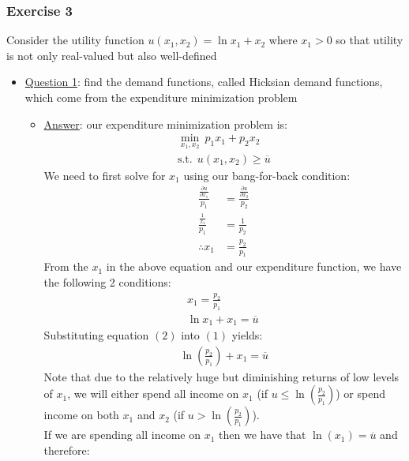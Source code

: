 \documentclass{article}
\begin{document}
\subsubsection{Exercise 3}
Consider the utility function $u(x_{1}, x_{2}) = \ln x_{1} + x_{2}$ where $x_{1} > 0$ so that utility is not only real-valued but also well-defined \par \vspace{0.3em}
\begin{itemize}
  \item  \underline{Question 1}: find the demand functions, called Hicksian demand functions, which come from the expenditure minimization problem
  \begin{itemize}
    \item  \underline{Answer}: our expenditure minimization problem is:
    \begin{gather*}
      \min_{x_{1},x_{2}} \ p_{1}x_{1} + p_{2}x_{2} \\
      \text{s.t.} \ \ u(x_{1}, x_{2}) \geq \overline{u}
    \end{gather*}
    We need to first solve for $x_{1}$ using our bang-for-back condition:
    \begin{align*}
      \frac{\tfrac{\partial u}{\partial x_{1}}}{p_{1}} &= \frac{\tfrac{\partial u}{\partial x_{2}}}{p_{2}} \\
      \frac{\tfrac{1}{x_{1}}}{p_{1}} &= \frac{1}{p_{2}} \\
      \therefore x_{1} &= \frac{p_{2}}{p_{1}}
    \end{align*}
    From the $x_{1}$ in the above equation and our expenditure function, we have the following 2 conditions:
    \begin{gather*}
      x_{1} = \frac{p_{2}}{p_{1}} \ \tag{1} \\
      \ln x_{1} + x_{1} = \overline{u} \ \tag{2}
    \end{gather*}
    Substituting equation $(2)$ into $(1)$ yields:
    \begin{gather*}
      \ln (\frac{p_{2}}{p_{1}}) + x_{1} = \overline{u}
    \end{gather*}
    Note that due to the relatively huge but diminishing returns of low levels of $x_{1}$, we will either spend all income on $x_{1}$ (if $u \leq \ln (\frac{p_{2}}{p_{1}})$) or spend income on both $x_{1}$ and $x_{2}$ (if $u > \ln (\frac{p_{2}}{p_{1}})$). \\
    If we are spending all income on $x_{1}$ then we have that $\ln(x_{1}) = \overline{u}$ and therefore:
    \begin{align*}

\end{align*}
\end{itemize}
\end{itemize}
\end{document}
